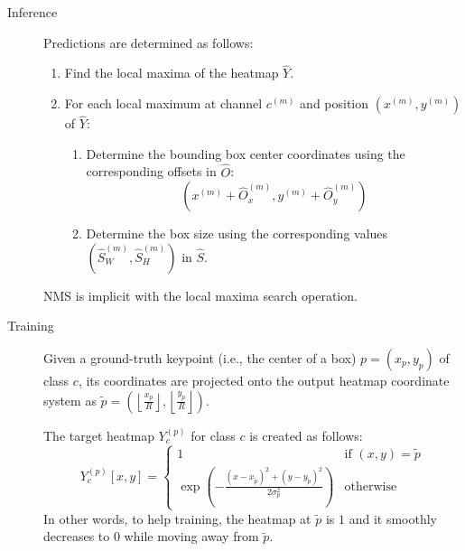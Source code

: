\begin{description}
\begin{description}
            \item[Inference]
                Predictions are determined as follows:
                \begin{enumerate}
                    \item Find the local maxima of the heatmap $\hat{Y}$.
                    \item For each local maximum at channel $c^{(m)}$ and position $(x^{(m)}, y^{(m)})$ of $\hat{Y}$:
                    \begin{enumerate}
                        \item Determine the bounding box center coordinates using the corresponding offsets in $\hat{O}$:
                        \[ (x^{(m)} + \hat{O}_x^{(m)}, y^{(m)} + \hat{O}_y^{(m)}) \]
                        \item Determine the box size using the corresponding values $(\hat{S}_W^{(m)}, \hat{S}_H^{(m)})$ in $\hat{S}$.
                    \end{enumerate}
                \end{enumerate}

                \begin{remark}
                    NMS is implicit with the local maxima search operation.
                \end{remark}

            \item[Training]
                Given a ground-truth keypoint (i.e., the center of a box) $p = (x_p, y_p)$ of class $c$, its coordinates are projected onto the output heatmap coordinate system as $\tilde{p} = (\left\lfloor \frac{x_p}{R} \right\rfloor, \left\lfloor \frac{y_p}{R} \right\rfloor)$.

                The target heatmap $Y_c^{(p)}$ for class $c$ is created as follows:
                \[
                    Y_c^{(p)}[x, y] = \begin{cases}
                        1 & \text{if $(x, y) = \tilde{p}$} \\
                        \exp\left( -\frac{(x-x_{\tilde{p}})^2 + (y-y_{\tilde{p}})^2}{2\sigma_p^2} \right) & \text{otherwise}
                    \end{cases}
                \]
                In other words, to help training, the heatmap at $\tilde{p}$ is $1$ and it smoothly decreases to $0$ while moving away from $\tilde{p}$.


\end{description}
\end{description}
